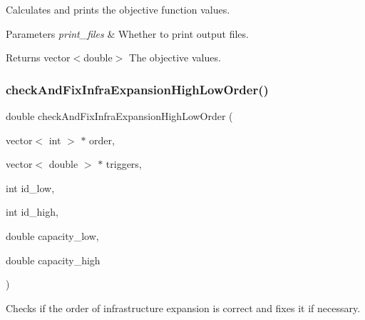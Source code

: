 Calculates and prints the objective function values. 


\begin{DoxyParams}{Parameters}
{\em print\+\_\+files} & Whether to print output files. \\
\hline
\end{DoxyParams}
\begin{DoxyReturn}{Returns}
vector$<$double$>$ The objective values. 
\end{DoxyReturn}
\mbox{\label{classProblem_ab12ec67ea5734be6c6c2ad46a08dba06_ab12ec67ea5734be6c6c2ad46a08dba06}} 
\subsubsection{\texorpdfstring{check\+And\+Fix\+Infra\+Expansion\+High\+Low\+Order()}{checkAndFixInfraExpansionHighLowOrder()}}
{\footnotesize\ttfamily double check\+And\+Fix\+Infra\+Expansion\+High\+Low\+Order (\begin{DoxyParamCaption}\item[{vector$<$ int $>$ $\ast$}]{order,  }\item[{vector$<$ double $>$ $\ast$}]{triggers,  }\item[{int}]{id\+\_\+low,  }\item[{int}]{id\+\_\+high,  }\item[{double}]{capacity\+\_\+low,  }\item[{double}]{capacity\+\_\+high }\end{DoxyParamCaption})\hspace{0.3cm}{\ttfamily [protected]}}



Checks if the order of infrastructure expansion is correct and fixes it if necessary. 


